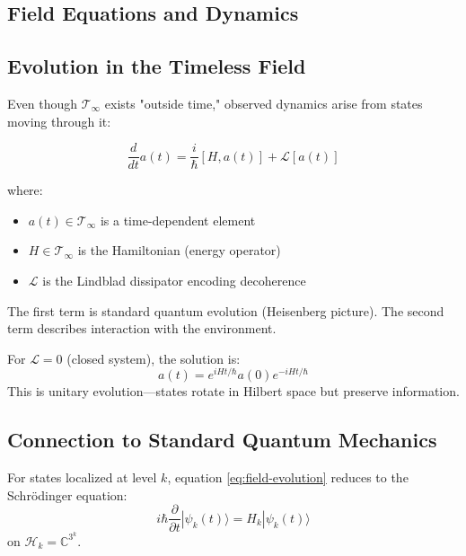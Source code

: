 \begin{defn}
\section{Field Equations and Dynamics}
\label{sec:field-equations}

\subsection{Evolution in the Timeless Field}

Even though $\mathcal{T}_\infty$ exists "outside time," observed dynamics arise from states moving through it:

\begin{equation}\label{eq:field-evolution}
\frac{d}{dt}a(t) = \frac{i}{\hbar}[H, a(t)] + \mathcal{L}[a(t)]
\end{equation}

where:
\begin{itemize}
\item $a(t) \in \mathcal{T}_\infty$ is a time-dependent element
\item $H \in \mathcal{T}_\infty$ is the Hamiltonian (energy operator)
\item $\mathcal{L}$ is the Lindblad dissipator encoding decoherence
\end{itemize}

The first term is standard quantum evolution (Heisenberg picture). The second term describes interaction with the environment.

\begin{example}
For $\mathcal{L} = 0$ (closed system), the solution is:
\begin{equation}
a(t) = e^{iHt/\hbar} a(0) e^{-iHt/\hbar}
\end{equation}
This is unitary evolution—states rotate in Hilbert space but preserve information.
\end{example}

\subsection{Connection to Standard Quantum Mechanics}

\begin{proposition}\label{prop:schrodinger}
For states localized at level $k$, equation \eqref{eq:field-evolution} reduces to the Schrödinger equation:
\begin{equation}
i\hbar \frac{\partial}{\partial t}|\psi_k(t)\rangle = H_k |\psi_k(t)\rangle
\end{equation}
on $\mathcal{H}_k = \mathbb{C}^{3^k}$.
\end{proposition}


\end{defn}
